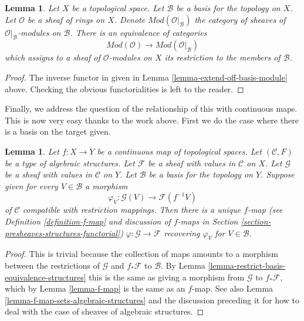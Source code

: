 \documentclass{stacks-project}
\theoremstyle{plain}
\newtheorem{lemma}[subsection]{Lemma}
\theoremstyle{definition}
\theoremstyle{remark}
\numberwithin{equation}{subsection}
\begin{document}
\begin{lemma}
\label{lemma-restrict-basis-equivalence-modules}
Let $X$ be a topological space.
Let $\mathcal{B}$ be a basis for the topology on $X$.
Let $\mathcal{O}$ be a sheaf of rings on $X$.
Denote $\textit{Mod}(\mathcal{O}|_\mathcal{B})$ the category of
sheaves of $\mathcal{O}|_\mathcal{B}$-modules on $\mathcal{B}$.
There is an equivalence of categories
$$
\textit{Mod}(\mathcal{O})
\longrightarrow
\textit{Mod}(\mathcal{O}|_\mathcal{B})
$$
which assigns to a sheaf of $\mathcal{O}$-modules on $X$ its restriction to
the members of $\mathcal{B}$.
\end{lemma}

\begin{proof}
The inverse functor in given in
Lemma \ref{lemma-extend-off-basis-module} above.
Checking the obvious functorialities is left to the reader.
\end{proof}

\noindent
Finally, we address the question of the relationship of this with
continuous maps. This is now very easy thanks to the work
above. First we do the case where there is a basis on the
target given.

\begin{lemma}
\label{lemma-f-map-basis-below-structures}
Let $f : X \to Y$ be a continuous map of topological spaces.
Let $(\mathcal{C}, F)$ be a type of algebraic structures.
Let $\mathcal{F}$ be a sheaf with values in $\mathcal{C}$ on $X$.
Let $\mathcal{G}$ be a sheaf with values in $\mathcal{C}$ on $Y$.
Let $\mathcal{B}$ be a basis for the topology on $Y$.
Suppose given for every $V \in \mathcal{B}$ a morphism
$$
\varphi_V :
\mathcal{G}(V)
\longrightarrow
\mathcal{F}(f^{-1}V)
$$
of $\mathcal{C}$ compatible with restriction mappings.
Then there is a unique $f$-map (see Definition \ref{definition-f-map}
and discussion of $f$-maps in
Section \ref{section-presheaves-structures-functorial})
$\varphi : \mathcal{G} \to \mathcal{F}$
recovering $\varphi_V$ for $V \in \mathcal{B}$.
\end{lemma}

\begin{proof}
This is trivial because the collection of maps
amounts to a morphism between the restrictions
of $\mathcal{G}$ and $f_*\mathcal{F}$ to $\mathcal{B}$.
By Lemma \ref{lemma-restrict-basis-equivalence-structures}
this is the same as giving a morphism from $\mathcal{G}$
to $f_*\mathcal{F}$, which by Lemma \ref{lemma-f-map}
is the same as an $f$-map. See also
Lemma \ref{lemma-f-map-sets-algebraic-structures}
and the discussion preceding it
for how to deal with the case of sheaves of algebraic structures.
\end{proof}
\end{document}
